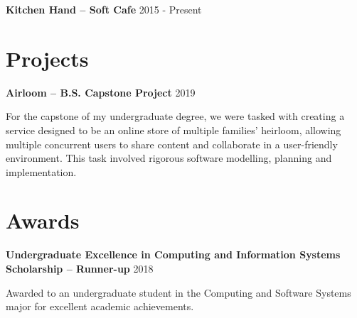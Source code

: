 \documentclass[10pt]{article}
\begin{document}
\begin{minipage}[t]{.60\textwidth}
\medskip

\textbf{Kitchen Hand -- Soft Cafe} \newline
{\footnotesize 2015 - Present}

\bigskip

\section{Projects}

\textbf{Airloom -- B.S. Capstone Project} \newline
{\footnotesize 2019}
\begin{flushleft}
For the capstone of my undergraduate degree, we were tasked with creating a service designed to be an online 
store of multiple families' heirloom, allowing multiple concurrent users to share content and collaborate in a 
user-friendly environment. This task involved rigorous software modelling, planning and implementation. 
\end{flushleft}

\bigskip

\section{Awards}
\textbf{Undergraduate Excellence in Computing and Information Systems Scholarship -- Runner-up} \newline
{\footnotesize 2018} 
\begin{flushleft}
Awarded to an undergraduate student in the Computing and Software Systems major for excellent academic achievements.
\end{flushleft}

\end{minipage}
\end{document}

